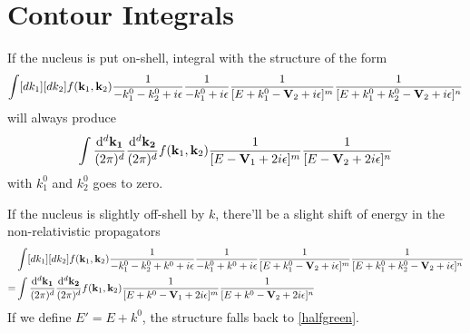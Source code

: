\documentclass[aps,prd,preprint,showkeys,10pt]{revtex4-1}
\begin{document}
\section{\label{appendix:contour}Contour Integrals}

If the nucleus is put on-shell, integral with the structure of the form
\begin{align}
	\int[dk_1][dk_2]f(\vb{k}_1,\vb{k}_2)\frac{1}{-k_1^0-k_2^0+i\epsilon}\frac{1}{-k_1^0+i\epsilon}\frac{1}{[E+k_1^0-\vb{V}_2+i\epsilon]^m}\frac{1}{[E+k_1^0+k_2^0-\vb{V}_2+i\epsilon]^n}\label{pretemporal}
\end{align}
will always produce
\begin{align}
	\int\frac{\dd^d\vb{k_1}}{(2\pi)^d}\frac{\dd^d\vb{k_2}}{(2\pi)^d}f(\vb{k}_1,\vb{k}_2)\frac{1}{[E-\vb{V}_1+2i\epsilon]^m}\frac{1}{[E-\vb{V}_2+2i\epsilon]^n}\label{halfgreen}
\end{align}
with $k_1^0$ and $k_2^0$ goes to zero.

If the nucleus is slightly off-shell by $k$, there'll be a slight shift of energy in the non-relativistic propagators
\begin{align*}
	  & \int[dk_1][dk_2]f(\vb{k}_1,\vb{k}_2)\frac{1}{-k_1^0-k_2^0+k^0+i\epsilon}\frac{1}{-k_1^0+k^0+i\epsilon}\frac{1}{[E+k_1^0-\vb{V}_2+i\epsilon]^m}\frac{1}{[E+k_1^0+k_2^0-\vb{V}_2+i\epsilon]^n} \\
	= & \int\frac{\dd^d\vb{k_1}}{(2\pi)^d}\frac{\dd^d\vb{k_2}}{(2\pi)^d}f(\vb{k}_1,\vb{k}_2)\frac{1}{[E+k^0-\vb{V}_1+2i\epsilon]^m}\frac{1}{[E+k^0-\vb{V}_2+2i\epsilon]^n}
\end{align*}
If we define $E'=E+k^0$, the structure falls back to \eqref{halfgreen}.
\end{document}
